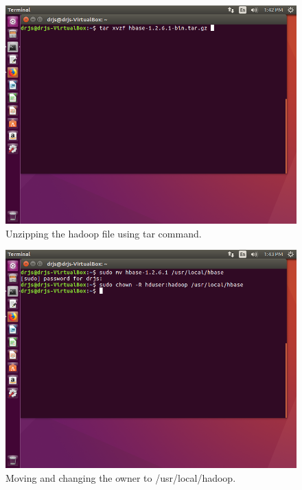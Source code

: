 \documentclass[a4paper,10pt]{article}
\begin{document}
\begin{figure}[h]
	\includegraphics[scale=0.33,center]{2.png}
	\caption{Unzipping the hadoop file using tar command.}
	\label{fig:03}
\end{figure}	

\begin{figure}[h]
	\includegraphics[scale=0.33,center]{3.png}
	\caption{Moving and changing the owner to /usr/local/hadoop.}
	\label{fig:04}
\end{figure}
\end{document}
